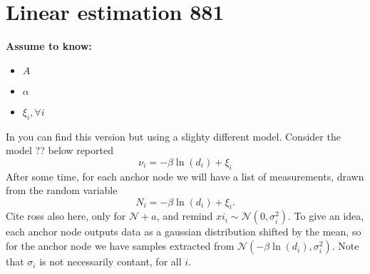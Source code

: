 \documentclass[12pt,twoside]{report}
\begin{document}
\section{Linear estimation 881}
  \begin{center}
  \textbf{Assume to know:}
  \begin{itemize}
    \centering
    \item $A$
    \item $\alpha$
    \item $\xi_i,\forall i$
  \end{itemize}
  \end{center}
In \cite{rzk} you can find this version but using a slighty different model.
Consider the model ?? below reported
\begin{equation}
    \nu_i=-\beta\ln(d_i)+\xi_i
\end{equation}
After some time, for each anchor node we will have a list of measurements, drawn from the random variable 
\begin{equation}
N_i=-\beta\ln(d_i)+\xi_i.
\end{equation}
Cite ross also here, only for $\mathcal{N}+a$, and remind $xi_i\sim\mathcal{N}(0,\sigma^2_i)$. To give an idea, each anchor node outputs data as a gaussian distribution shifted by the mean, so for the anchor node we have samples extracted from $\mathcal{N}(-\beta\ln(d_i), \sigma_i^2)$. Note that $\sigma_i$ is not necessarily contant, for all $i$.
\end{document}
